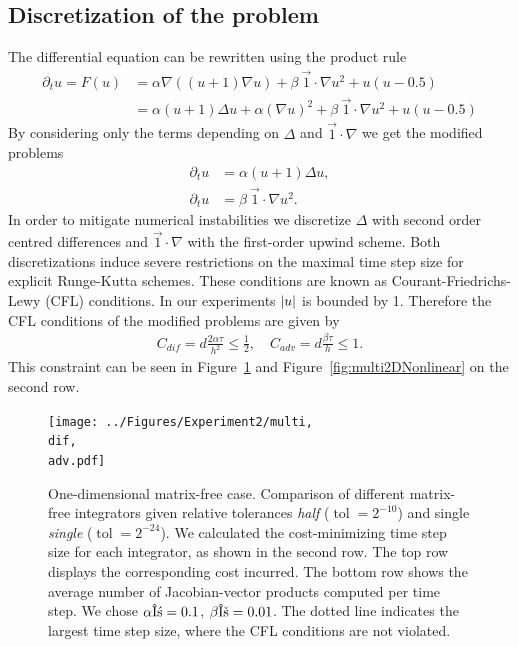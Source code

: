 \documentclass{scrartcl}
\begin{document}
	\subsection{Discretization of the problem}
	The differential equation can be rewritten using the product rule
	\begin{align*}
		\partial_{t}u = F(u) 
			&= \alpha\nabla((u+1)\nabla u) 
				+ \beta\ \vec{1}\!\cdot\!\nabla u^2
				+ u(u-0.5) \\
			&= \alpha(u+1)\Delta u + \alpha(\nabla u)^2 
				+ \beta\ \vec{1}\!\cdot\!\nabla u^2 + u(u-0.5) 				
	\end{align*}
	By considering only the terms depending on $\Delta $ and $\vec{1}\!\cdot\!\nabla $ we get the modified problems
	\begin{align*}
		\partial_{t}u &= \alpha(u+1)\Delta u,
		 \\
		\partial_{t}u &= \beta~\vec{1}\!\cdot\!\nabla u^2 .
	\end{align*}
	In order to mitigate numerical instabilities we discretize $\Delta$ with second order centred differences and $\vec{1}\!\cdot\!\nabla$ with the first-order upwind scheme. Both discretizations induce severe restrictions on the maximal time step size for explicit Runge-Kutta schemes. These conditions are known as Courant-Friedrichs-Lewy (CFL) conditions. In our experiments $\lvert u\rvert$ is bounded by 1. Therefore the CFL conditions of the modified problems are given by
	\begin{align} \label{eq:CFL}
		C_{dif} = d\frac{2\alpha\tau}{h^2} \le \frac{1}{2}, \quad C_{adv} = d\frac{\beta\tau}{h} \le 1.
	\end{align}
	This constraint can be seen in Figure~\ref{fig:multi1DNonlinear} and Figure~\ref{fig:multi2DNonlinear} on the second row. 
	
	\begin{figure}[t]
		\newcommand{\dif}{\detokenize{α}=0.1}
		\newcommand{\adv}{\detokenize{β}=0.01}
		\centering
		\texttt{[image: ../Figures/Experiment2/multi, \\dif, \\adv.pdf]}
		\caption{One-dimensional matrix-free case. Comparison of different matrix-free integrators given relative tolerances \textit{half} ($\operatorname{tol} = 2^{-10}$) and single \textit{single} ($\operatorname{tol} = 2^{-24}$). We calculated the cost-minimizing time step size for each integrator, as shown in the second row. The top row displays the corresponding cost incurred. The bottom row shows the average number of Jacobian-vector products computed per time step. We chose $\alpha\dif$, $\beta\adv$. The dotted line indicates the largest time step size, where the CFL conditions are not violated.}
		\label{fig:multi1DNonlinear}
	\end{figure}
	
\end{document}
